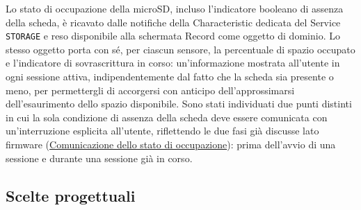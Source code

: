 Lo stato di occupazione della microSD, incluso l'indicatore booleano di assenza della scheda, è ricavato dalle notifiche della Characteristic
dedicata del Service \texttt{STORAGE} e reso disponibile alla schermata Record come oggetto di dominio. Lo stesso oggetto porta con sé, per
ciascun sensore, la percentuale di spazio occupato e l'indicatore di sovrascrittura in corso: un'informazione mostrata all'utente in ogni
sessione attiva, indipendentemente dal fatto che la scheda sia presente o meno, per permettergli di accorgersi con anticipo dell'approssimarsi
dell'esaurimento dello spazio disponibile. Sono stati individuati due punti distinti in cui la sola condizione di assenza della scheda deve
essere comunicata con un'interruzione esplicita all'utente, riflettendo le due fasi già discusse lato firmware
(\hyperref[subsec:storage_status]{Comunicazione dello stato di occupazione}): prima dell'avvio di una sessione e durante una sessione già in corso.

\subsection{Scelte progettuali}

